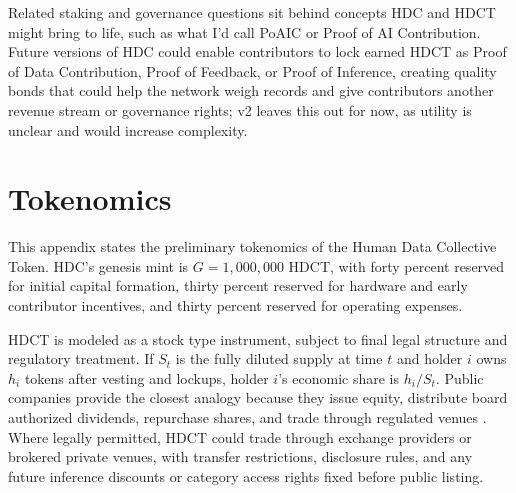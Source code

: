 \documentclass[10pt,a4paper,twocolumn]{article}
\begin{document}
Related staking and governance questions sit behind concepts HDC and HDCT might bring to life, such as what I'd call PoAIC or Proof of AI Contribution. Future versions of HDC could enable contributors to lock earned HDCT as Proof of Data Contribution, Proof of Feedback, or Proof of Inference, creating quality bonds that could help the network weigh records and give contributors another revenue stream or governance rights; v2 leaves this out for now, as utility is unclear and would increase complexity.

\appendix
\section{Tokenomics}
\label{sec:appendix-tokenomics}

This appendix states the preliminary tokenomics of the Human Data Collective Token. HDC's genesis mint is $G=1{,}000{,}000$ HDCT, with forty percent reserved for initial capital formation, thirty percent reserved for hardware and early contributor incentives, and thirty percent reserved for operating expenses.

\begin{center}
\end{center}

HDCT is modeled as a stock type instrument, subject to final legal structure and regulatory treatment. If $S_t$ is the fully diluted supply at time $t$ and holder $i$ owns $h_i$ tokens after vesting and lockups, holder $i$'s economic share is $h_i/S_t$. Public companies provide the closest analogy because they issue equity, distribute board authorized dividends, repurchase shares, and trade through regulated venues \citep{sec2023repurchases}. Where legally permitted, HDCT could trade through exchange providers or brokered private venues, with transfer restrictions, disclosure rules, and any future inference discounts or category access rights fixed before public listing.
\end{document}
